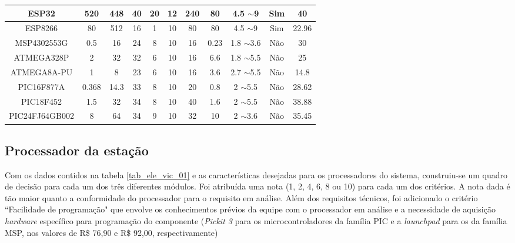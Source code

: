 \begin{table}[H]
\begin{miniscule}
\begin{tabular}{|c|c|c|c|c|c|c|c|c|c|c|}
			ESP32 & 520 & 448 & 40 & 20 & 12 & 240 & 80 & 4.5 $\sim$9 & Sim & 40 \\ \hline
			ESP8266 & 80 & 512 & 16 & 1 & 10 & 80 & 80 & 4.5 $\sim$9 & Sim & 22.96 \\ \hline
			MSP4302553G & 0.5 & 16 & 24 & 8 & 10 & 16 & 0.23 & 1.8 $\sim$3.6 & Não & 30 \\ \hline
			ATMEGA328P & 2 & 32 & 32 & 6 & 10 & 16 & 6.6 & 1.8 $\sim$5.5 & Não & 25 \\ \hline
			ATMEGA8A-PU & 1 & 8 & 23 & 6 & 10 & 16 & 3.6 & 2.7 $\sim$5.5 & Não & 14.8 \\ \hline
			PIC16F877A & 0.368 & 14.3 & 33 & 8 & 10 & 20 & 0.8 & 2 $\sim$5.5 & Não & 28.62 \\ \hline
			PIC18F452 & 1.5 & 32 & 34 & 8 & 10 & 40 & 1.6 & 2 $\sim$5.5 & Não & 38.88 \\ \hline
			PIC24FJ64GB002 & 8 & 64 & 34 & 9 & 10 & 32 & 10 & 2 $\sim$3.6 & Não & 35.45 \\ \hline
			\end{tabular}
		\end{miniscule}
	\end{table}

	\subsection{Processador da estação}

	Com os dados contidos na tabela \ref{tab_ele_vic_01} e as características desejadas para os processadores do sistema, construiu-se um quadro de decisão para cada um dos três diferentes módulos. Foi atribuída uma nota (1, 2, 4, 6, 8 ou 10) para cada um dos critérios. A nota dada é tão maior quanto a conformidade do processador para o requisito em análise. Além dos requisitos técnicos, foi adicionado o critério ``Facilidade de programação" que envolve os conhecimentos prévios da equipe com o processador em análise e a necessidade de aquisição \emph{hardware} específico para programação do componente (\emph{Pickit 3} para os microcontroladores da família PIC e a \emph{launchpad} para os da família MSP, nos valores de R\$ 76,90 e R\$ 92,00, respectivamente)

